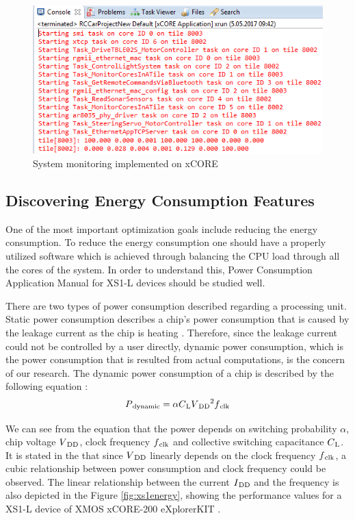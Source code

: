 \begin{figure}[!ht]
	\centering
	\captionsetup{justification=centering}
	\includegraphics[width=\textwidth]{content/images/finalmonitoring.png}
	\caption{System monitoring implemented on xCORE}
	\label{fig:finalmonitoring}
\end{figure}

\subsection{Discovering Energy Consumption Features}
One of the most important optimization goals include reducing the energy consumption. To reduce the energy consumption one should have a properly utilized software which is achieved through balancing the CPU load through all the cores of the system. In order to understand this, Power Consumption Application Manual for XS1-L devices \cite{xs1energymanual} should be studied well. 

There are two types of power consumption described regarding a processing unit. Static power consumption describes a chip's power consumption that is caused by the leakage current as the chip is heating \cite{springerparallel}. Therefore, since the leakage current could not be controlled by a user directly, dynamic power consumption, which is the power consumption that is resulted from actual computations, is the concern of our research. The dynamic power consumption of a chip is described by the following equation \cite{dvfspaper}: 
\begin{equation} \label{dyneq}
P\textsubscript{dynamic} = {\alpha} {C\textsubscript{L}} {V\textsubscript{DD}\textsuperscript{2}} {f\textsubscript{clk}}
\end{equation}

We can see from the equation that the power depends on switching probability ${\alpha}$, chip voltage ${V\textsubscript{DD}}$, clock frequency ${f\textsubscript{clk}}$ and collective switching capacitance ${C\textsubscript{L}}$. It is stated in the \cite{springerparallel} that since ${V\textsubscript{DD}}$ linearly depends on the clock frequency ${f\textsubscript{clk}}$, a cubic relationship between power consumption and clock frequency could be observed. The linear relationship between the current ${I\textsubscript{DD}}$ and the frequency is also depicted in the Figure \ref{fig:xs1energy}, showing the performance values for a XS1-L device of XMOS xCORE-200 eXplorerKIT \cite{xs1energymanual}.

